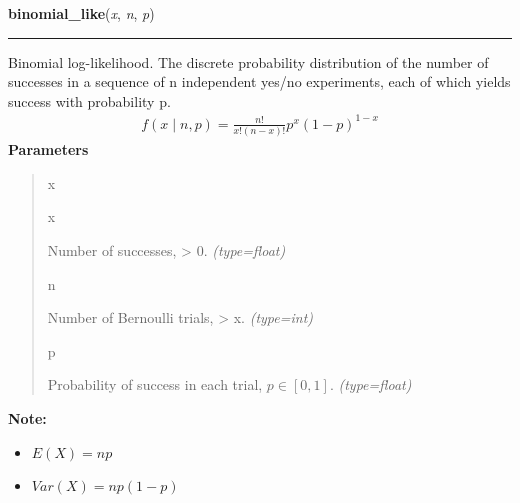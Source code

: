     \vspace{0.5ex}

\hspace{.8\funcindent}\begin{boxedminipage}{\funcwidth}

    \raggedright \textbf{binomial\_like}(\textit{x}, \textit{n}, \textit{p})

    \vspace{-1.5ex}

    \rule{\textwidth}{1pt}
\setlength{\parskip}{2ex}

Binomial log-likelihood.  The discrete probability distribution of the
number of successes in a sequence of n independent yes/no experiments,
each of which yields success with probability p.
\begin{equation*}\begin{split}f(x \mid n, p) = \frac{n!}{x!(n-x)!} p^x (1-p)^{1-x}\end{split}\end{equation*}\setlength{\parskip}{1ex}
      \textbf{Parameters}
      \vspace{-1ex}

      \begin{quote}
        \begin{Ventry}{x}

          \item[x]


Number of successes, {\textgreater} 0.
            {\it (type=float)}

          \item[n]


Number of Bernoulli trials, {\textgreater} x.
            {\it (type=int)}

          \item[p]


Probability of success in each trial, $p \in [0,1]$.
            {\it (type=float)}

        \end{Ventry}

      \end{quote}

\textbf{Note:} \begin{itemize}
\item {} 
$E(X)=np$

\item {} 
$Var(X)=np(1-p)$

\end{itemize}


    \end{boxedminipage}

